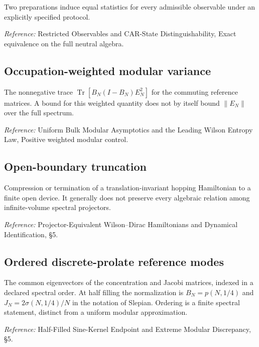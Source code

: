 \documentclass[
  10pt,
  a4paper,
]{article}
\begin{document}
Two preparations induce equal statistics for every admissible observable under an explicitly specified protocol.

\nopagebreak[4]

\emph{Reference:} Restricted Observables and CAR-State Distinguishability, Exact equivalence on the full neutral algebra.

\subsection{Occupation-weighted modular variance}\label{occupation-weighted-modular-variance}

The nonnegative trace \(\operatorname{Tr}[B_N(I-B_N)E_N^2]\) for the commuting reference matrices. A bound for this weighted quantity does not by itself bound \(\|E_N\|\) over the full spectrum.

\nopagebreak[4]

\emph{Reference:} Uniform Bulk Modular Asymptotics and the Leading Wilson Entropy Law, Positive weighted modular control.

\subsection{Open-boundary truncation}\label{open-boundary-truncation}

Compression or termination of a translation-invariant hopping Hamiltonian to a finite open device. It generally does not preserve every algebraic relation among infinite-volume spectral projectors.

\nopagebreak[4]

\emph{Reference:} Projector-Equivalent Wilson--Dirac Hamiltonians and Dynamical Identification, §5.

\subsection{Ordered discrete-prolate reference modes}\label{ordered-discrete-prolate-reference-modes}

The common eigenvectors of the concentration and Jacobi matrices, indexed in a declared spectral order. At half filling the normalization is \(B_N=p(N,1/4)\) and \(J_N=2\sigma(N,1/4)/N\) in the notation of Slepian. Ordering is a finite spectral statement, distinct from a uniform modular approximation.

\nopagebreak[4]

\emph{Reference:} Half-Filled Sine-Kernel Endpoint and Extreme Modular Discrepancy, §5.
\end{document}
